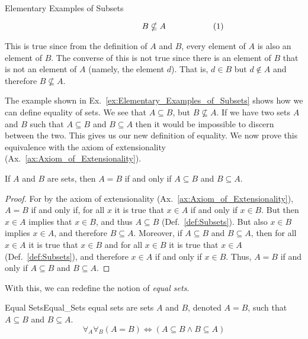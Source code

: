 \begin{fexample}{Elementary Examples of Subsets}
\begin{subequations}
\begin{minipage}[b]{0.49\textwidth}
\begin{equation}
                        B\nsubseteq{A}
                    \end{equation}
                \end{minipage}
            \end{subequations}
            \par\vspace{2.5ex}
            This is true since from the definition of $A$ and $B$, every element
            of $A$ is also an element of $B$. The converse of this is not true
            since there is an element of $B$ that is not an element of $A$
            (namely, the element $d$). That is, $d\in{B}$ but $d\notin{A}$ and
            therefore $B\nsubseteq{A}$.
        \end{fexample}
        The example shown in Ex.~\ref{ex:Elementary_Examples_of_Subsets} shows
        how we can define equality of sets. We see that $A\subseteq{B}$, but
        $B\nsubseteq{A}$. If we have two sets $A$ and $B$ such that
        $A\subseteq{B}$ and $B\subseteq{A}$ then it would be impossible to
        discern between the two. This gives us our new definition of equality.
        We now prove this equivalence with the axiom of extensionality%
         (Ax.~\ref{ax:Axiom_of_Extensionality}).
        \begin{theorem}
            \label{thm:Equivalent_Def_of_Equality}%
            If $A$ and $B$ are sets, then $A=B$ if and only if $A\subseteq{B}$
            and $B\subseteq{A}$.
        \end{theorem}
        \begin{proof}
            For by the axiom of extensionality
            (Ax.~\ref{ax:Axiom_of_Extensionality}), $A=B$ if and only if, for
            all $x$ it is true that $x\in{A}$ if and only if $x\in{B}$. But then
            $x\in{A}$ implies that $x\in{B}$, and thus $A\subseteq{B}$
            (Def.~\ref{def:Subsets}). But also $x\in{B}$ implies $x\in{A}$, and
            therefore $B\subseteq{A}$. Moreover, if $A\subseteq{B}$ and
            $B\subseteq{A}$, then for all $x\in{A}$ it is true that $x\in{B}$
            and for all $x\in{B}$ it is true that $x\in{A}$
            (Def.~\ref{def:Subsets}), and therefore $x\in{A}$ if and only if
            $x\in{B}$. Thus, $A=B$ if and only if $A\subseteq{B}$ and
            $B\subseteq{A}$.
        \end{proof}
        With this, we can redefine the notion of
        \textit{equal sets}.
        \begin{fdefinition}{Equal Sets}{Equal_Sets}
            \Glspl{equal set} are \glspl{set} $A$ and $B$, denoted $A=B$, such
            that $A\subseteq{B}$ and $B\subseteq{A}$.
            \begin{equation*}
                \forall_{A}\forall_{B}(A=B)
                \Leftrightarrow
                (A\subseteq{B}\land{B}\subseteq{A})
            \end{equation*}
        \end{fdefinition}
